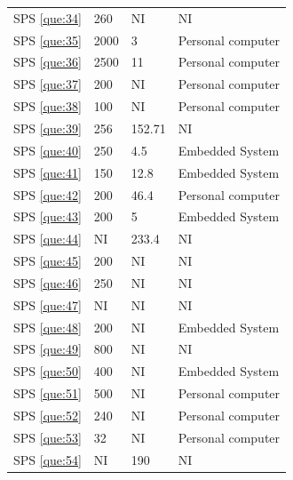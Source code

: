 \documentclass[sensors,review,accept,moreauthors,pdftex]{Definitions/mdpi}
\begin{document}
\begin{table}[H]
\begin{tabular}{p{33pt}p{40pt}p{40pt}p{100pt}}
		
		SPS \ref{que:34}	&	260	&	NI	&	NI	\\	
		SPS \ref{que:35}	&	2000	&	3	&	Personal computer	\\	
		SPS \ref{que:36}	&	2500	&	11	&	Personal computer	\\	
		SPS \ref{que:37}	&	200	&	NI	&	Personal computer	\\	
		SPS \ref{que:38}	&	100	&	NI	&	Personal computer	\\	
		SPS \ref{que:39}	&	256	&	152.71	&	NI	\\	
		SPS \ref{que:40}	&	250	&	4.5	&	Embedded System	\\	
		SPS \ref{que:41}	&	150	&	12.8	&	Embedded System	\\	
		SPS \ref{que:42}	&	200	&	46.4	&	Personal computer	\\	
		SPS \ref{que:43}	&	200	&	5	&	Embedded System	\\	
		SPS \ref{que:44}	&	NI	&	233.4	&	NI	\\	
		SPS \ref{que:45}	&	200	&	NI	&	NI	\\	
		SPS \ref{que:46}	&	250	&	NI	&	NI	\\	
		SPS \ref{que:47}	&	NI	&	NI	&	NI	\\	
		SPS \ref{que:48}	&	200	&	NI	&	Embedded System	\\	
		SPS \ref{que:49}	&	800	&	NI	&	NI	\\	
		SPS \ref{que:50}	&	400	&	NI	&	Embedded System	\\	
		SPS \ref{que:51}	&	500	&	NI	&	Personal computer	\\	
		SPS \ref{que:52}	&	240	&	NI	&	Personal computer	\\	
		SPS \ref{que:53}	&	32	&	NI	&	Personal computer	\\	
		SPS \ref{que:54}	&	NI	&	190	&	NI	\\	
		\bottomrule
		\end{tabular}
\end{table}
\end{document}
